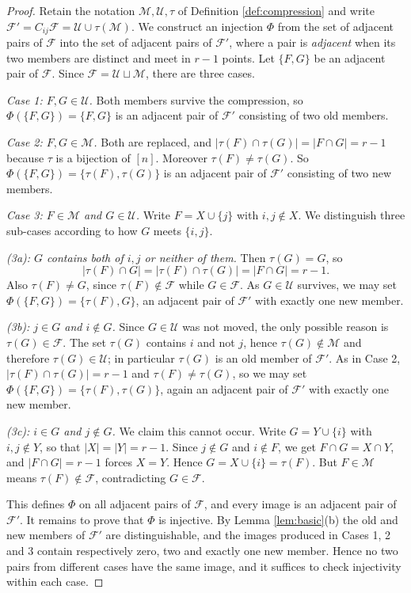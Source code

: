 \documentclass[11pt,reqno]{amsart}
\theoremstyle{plain}
\theoremstyle{definition}
\newcommand{\F}{\mathcal{F}}
\newcommand{\Uu}{\mathcal{U}}
\newcommand{\M}{\mathcal{M}}
\begin{document}
\begin{proof}
Retain the notation $\M,\Uu,\tau$ of Definition \ref{def:compression} and write
$\F'=C_{ij}\F=\Uu\cup\tau(\M)$. We construct an injection $\Phi$ from the set of adjacent pairs of
$\F$ into the set of adjacent pairs of $\F'$, where a pair is \emph{adjacent} when its two members
are distinct and meet in $r-1$ points. Let $\{F,G\}$ be an adjacent pair of $\F$. Since
$\F=\Uu\sqcup\M$, there are three cases.

\smallskip
\noindent\textit{Case 1: $F,G\in\Uu$.} Both members survive the compression, so
$\Phi(\{F,G\})=\{F,G\}$ is an adjacent pair of $\F'$ consisting of two old members.

\smallskip
\noindent\textit{Case 2: $F,G\in\M$.} Both are replaced, and
$|\tau(F)\cap\tau(G)|=|F\cap G|=r-1$ because $\tau$ is a bijection of $[n]$. Moreover
$\tau(F)\ne\tau(G)$. So $\Phi(\{F,G\})=\{\tau(F),\tau(G)\}$ is an adjacent pair of $\F'$ consisting
of two new members.

\smallskip
\noindent\textit{Case 3: $F\in\M$ and $G\in\Uu$.} Write $F=X\cup\{j\}$ with $i,j\notin X$. We
distinguish three sub-cases according to how $G$ meets $\{i,j\}$.

\smallskip
\noindent\textit{(3a): $G$ contains both of $i,j$ or neither of them.} Then $\tau(G)=G$, so
\[
|\tau(F)\cap G|=|\tau(F)\cap\tau(G)|=|F\cap G|=r-1 .
\]
Also $\tau(F)\ne G$, since $\tau(F)\notin\F$ while $G\in\F$. As $G\in\Uu$ survives, we may set
$\Phi(\{F,G\})=\{\tau(F),G\}$, an adjacent pair of $\F'$ with exactly one new member.

\smallskip
\noindent\textit{(3b): $j\in G$ and $i\notin G$.} Since $G\in\Uu$ was not moved, the only possible
reason is $\tau(G)\in\F$. The set $\tau(G)$ contains $i$ and not $j$, hence $\tau(G)\notin\M$ and
therefore $\tau(G)\in\Uu$; in particular $\tau(G)$ is an old member of $\F'$. As in Case 2,
$|\tau(F)\cap\tau(G)|=r-1$ and $\tau(F)\ne\tau(G)$, so we may set
$\Phi(\{F,G\})=\{\tau(F),\tau(G)\}$, again an adjacent pair of $\F'$ with exactly one new member.

\smallskip
\noindent\textit{(3c): $i\in G$ and $j\notin G$.} We claim this cannot occur. Write $G=Y\cup\{i\}$
with $i,j\notin Y$, so that $|X|=|Y|=r-1$. Since $j\notin G$ and $i\notin F$, we get
$F\cap G=X\cap Y$, and $|F\cap G|=r-1$ forces $X=Y$. Hence $G=X\cup\{i\}=\tau(F)$. But $F\in\M$
means $\tau(F)\notin\F$, contradicting $G\in\F$.

\smallskip
This defines $\Phi$ on all adjacent pairs of $\F$, and every image is an adjacent pair of $\F'$. It
remains to prove that $\Phi$ is injective. By Lemma \ref{lem:basic}(b) the old and new members of
$\F'$ are distinguishable, and the images produced in Cases 1, 2 and 3 contain respectively zero,
two and exactly one new member. Hence no two pairs from different cases have the same image, and it
suffices to check injectivity within each case.


\end{proof}
\end{document}
